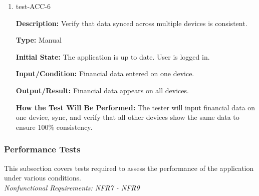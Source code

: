 \documentclass[12pt, titlepage]{article}
\begin{document}
\begin{enumerate}
\item{test-ACC-6\\}

\textbf{Description:} Verify that data synced across multiple devices is
consistent.

\textbf{Type:} Manual
					
\textbf{Initial State:} The application is up to date. User is logged in.
					
\textbf{Input/Condition:} Financial data entered on one device.
					
\textbf{Output/Result:} Financial data appears on all devices.
					
\textbf{How the Test Will Be Performed:} The tester will input financial data on
one device, sync, and verify that all other devices show the same data to ensure
100\% consistency.

\end{enumerate}

\subsubsection{Performance Tests}

This subsection covers tests required to assess the performance of the application under various conditions.\\
\textit{Nonfunctional Requirements: NFR7 - NFR9}
\end{document}
